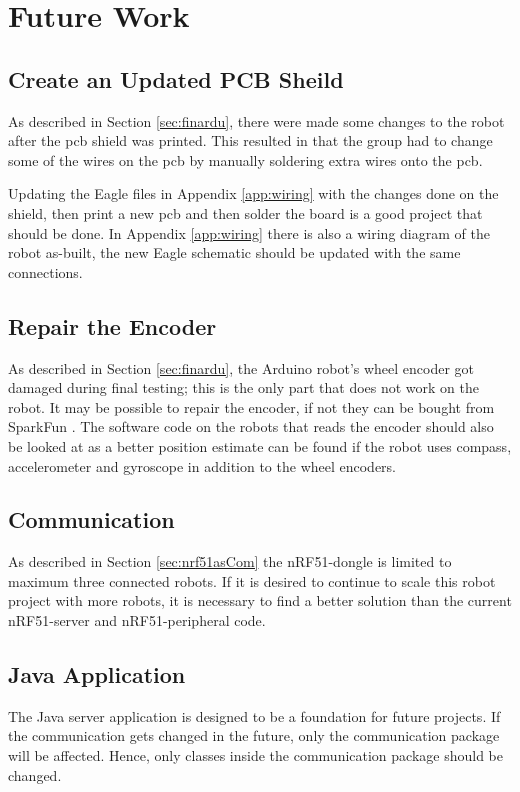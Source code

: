 \chapter{Future Work}
    \section{Create an Updated PCB Sheild}
        \label{sec:fwSkjold}
        As described in Section \ref{sec:finardu}, there were made some changes to the robot after the \acrshort{pcb} shield was printed. This resulted in that the group had to change some of the wires on the \acrshort{pcb} by manually soldering extra wires onto the \acrshort{pcb}. 

        Updating the Eagle files in Appendix \ref{app:wiring} with the changes done on the shield, then print a new \acrshort{pcb} and then solder the board is a good project that should be done. In Appendix \ref{app:wiring} there is also a wiring diagram of the robot as-built, the new Eagle schematic should be updated with the same connections.

    \section{Repair the Encoder}
        As described in Section \ref{sec:finardu}, the Arduino robot's wheel encoder got damaged during final testing; this is the only part that does not work on the robot. It may be possible to repair the encoder, if not they can be bought from SparkFun \cite{sparkfun}. The software code on the robots that reads the encoder should also be looked at as a better position estimate can be found if the robot uses compass, accelerometer and gyroscope in addition to the wheel encoders.

    \section{Communication}
        As described in Section \ref{sec:nrf51asCom} the nRF51-dongle is limited to maximum three connected robots. If it is desired to continue to scale this robot project with more robots, it is necessary to find a better solution than the current nRF51-server and nRF51-peripheral code.

    \section{Java Application}
        The Java server application is designed to be a foundation for future projects. If the communication gets changed in the future, only the communication package will be affected. Hence, only classes inside the communication package should be changed.


